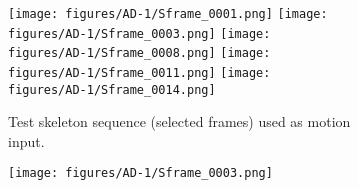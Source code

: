 \documentclass[final-report]{report-template}
\begin{document}
\begin{figure}[htbp]
    \centering
    
    \begin{subfigure}[t]{\textwidth}
        \centering
        \texttt{[image: figures/AD-1/Sframe\_0001.png]}
        \texttt{[image: figures/AD-1/Sframe\_0003.png]}
        \texttt{[image: figures/AD-1/Sframe\_0008.png]}
        \texttt{[image: figures/AD-1/Sframe\_0011.png]}
        \texttt{[image: figures/AD-1/Sframe\_0014.png]}
        \caption{Test skeleton sequence (selected frames) used as motion input.}
    \end{subfigure}
    

\begin{subfigure}[t]{\textwidth}
    \centering
    \texttt{[image: figures/AD-1/Sframe\_0003.png]}
\end{subfigure}
    

    \begin{subfigure}[t]{\textwidth}
        \centering
    \end{subfigure}


\end{figure}
\end{document}
